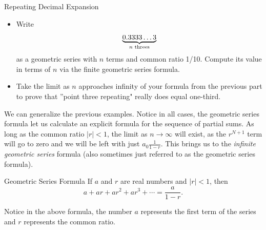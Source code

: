 \begin{exercise}{Repeating Decimal Expansion \Coffeecup \Coffeecup }
\begin{itemize}
\item Write $$ \underbrace{0.3333 \ldots 3}_{n \textup{ threes}} $$ as a geometric series with $n$ terms and common ratio 1/10.  Compute its value in terms of $n$ via the finite geometric series formula.


\item Take the limit as $n$ approaches infinity of your formula from the previous part to prove that ''point three repeating" really does equal one-third.

\end{itemize}
\end{exercise}

We can generalize the previous examples.  Notice in all cases, the geometric series formula let us calculate an explicit formula for the sequence of partial sums.  As long as the common ratio $|r|<1$, the limit as $n\rightarrow \infty$ will exist, as the $r^{N+1}$ term will go to zero and we will be left with just $a_0\frac{1}{1-r}$.  This brings us to the \emph{infinite geometric series} formula (also sometimes just referred to as the geometric series formula).

\begin{theorem}{ Geometric Series Formula }
If $a$ and $r$ are real numbers and $|r|<1$, then $$a+ar+ar^2+ar^3+\cdots=\frac{a}{1-r}.$$  
\end{theorem}

Notice in the above formula, the number $a$ represents the first term of the series and $r$ represents the common ratio.

